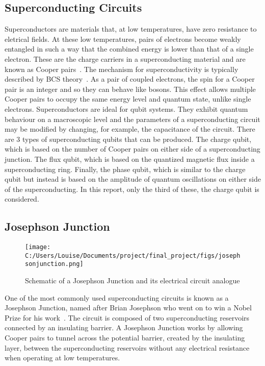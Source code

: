 \documentclass[11pt]{article}
\begin{document}
\subsection{Superconducting Circuits}
Superconductors are materials that, at low temperatures, have zero resistance to eletrical fields. At these low temperatures, pairs of electrons become weakly entangled in such a way that the combined energy is lower than that of a single electron. These are the charge carriers in a superconducting material and are known as Cooper pairs~\cite{CooperBoundElectronPairs1956}. The mechanism for superconductivity is typically described by BCS theory~\cite{bardeenTheorySuperconductivity1957}. As a pair of coupled electrons, the spin for a Cooper pair is an integer and so they can behave like bosons. This effect allows multiple Cooper pairs to occupy the same energy level and quantum state, unlike single electrons. Superconductors are ideal for qubit systems. They exhibit quantum behaviour on a macroscopic level and the parameters of a superconducting circuit may be modified by changing, for example, the capacitance of the circuit. There are 3 types of superconducting qubits that can be produced. The charge qubit, which is based on the number of Cooper pairs on either side of a superconducting junction. The flux qubit, which is based on the quantized magnetic flux inside a superconducting ring. Finally, the phase qubit, which is similar to the charge qubit but instead is based on the amplitude of quantum oscillations on either side of the superconducting. In this report, only the third of these, the charge qubit is considered.

\subsection{Josephson Junction}
\begin{figure}[ht]
\centering
\texttt{[image: C:/Users/Louise/Documents/project/final\_project/figs/josephsonjunction.png]}
\caption{Schematic of a Josephson Junction and its electrical circuit analogue}
\label{fig:picture1}
\end{figure}
One of the most commonly used superconducting circuits is known as a Josephson Junction, named after Brian Josephson who went on to win a Nobel Prize for his work~\cite{josephsonDiscoveryTunnellingSupercurrents1974,josephsonPossibleNewEffects1962}.
The circuit is composed of two superconducting reservoirs connected by an insulating barrier.
A Josephson Junction works by allowing Cooper pairs to tunnel across the potential barrier, created by the insulating layer, between the superconducting reservoirs without any electrical resistance when operating at low temperatures.
\end{document}

